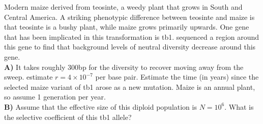 \begin{question}{}
  Modern maize derived from teosinte, a weedy plant that grows in South and
  Central America. A striking phenotypic difference between teosinte and maize
  is that teosinte is a bushy plant, while maize grows primarily upwards. One
  gene that has been implicated in this transformation is tb1. \citet{wang1999limits} sequenced a region around this
  gene to find that background levels of neutral diversity decrease around this
  gene.\\

{\bf A)} It takes roughly 300bp for the diversity to recover moving
away from the sweep.  \citeauthor{wang1999limits} estimate
$r = 4 \times 10^{-7}$ per base pair. Estimate the time (in years) since the selected maize
variant of tb1 arose as a new mutation. Maize is an annual plant, so assume 1
generation per year.\\
{\bf B)} Assume that the effective size of this diploid population is $N = 10^6$. What is the selective
coefficient of this tb1 allele?
\end{question}

